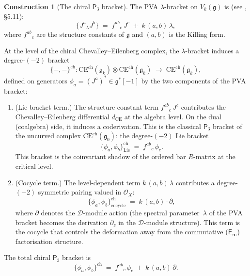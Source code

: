 \documentclass[11pt,reqno]{amsart}
\theoremstyle{definition}
\newtheorem{construction}[theorem]{Construction}
\theoremstyle{remark}
\newcommand{\cD}{\mathcal{D}}
\newcommand{\cO}{\mathcal{O}}
\newcommand{\CE}{\mathrm{CE}}
\newcommand{\Einf}{\mathsf{E}_{\infty}}
\newcommand{\Pthree}{\mathsf{P}_{3}}
\newcommand{\fg}{\mathfrak{g}}
\numberwithin{equation}{section}
\begin{document}
\begin{construction}[The chiral $\Pthree$ bracket]
\label{constr:chiral-p3-bracket}
The PVA $\lambda$-bracket on $V_k(\fg)$ is
(see \cite{Lorgat26I}, \S5.11):
\begin{equation}\label{eq:pva-bracket-recall}
  \{J^a \mathbin{{}_\lambda} J^b\}
  \;=\;
  f^{ab}{}_c\, J^c \;+\; k\,(a,b)\,\lambda,
\end{equation}
where $f^{ab}{}_c$ are the structure constants of $\fg$ and
$(a,b)$ is the Killing form.

At the level of the chiral Chevalley--Eilenberg complex, the
$\lambda$-bracket induces a degree-$(-2)$ bracket
\begin{equation}\label{eq:chiral-p3-def}
  \{-,-\}^{\mathrm{ch}}
  \colon
  \CE^{\mathrm{ch}}(\fg_k)
  \otimes
  \CE^{\mathrm{ch}}(\fg_k)
  \;\longrightarrow\;
  \CE^{\mathrm{ch}}(\fg_k),
\end{equation}
defined on generators $\phi_a = (J^a)^* \in \fg^*[-1]$ by
the two components of the PVA bracket:
\begin{enumerate}[label=\textup{(\roman*)}]
\item \textup{(Lie bracket term.)}
  The structure constant term $f^{ab}{}_c\,J^c$ contributes
  the Chevalley--Eilenberg differential $d_{\CE}$ at the
  algebra level. On the dual (coalgebra) side, it induces a
  coderivation.
  This is the classical $\Pthree$ bracket of the
  uncurved complex $\CE^{\mathrm{ch}}(\fg_0)$: the degree-$(-2)$
  Lie bracket
  \begin{equation}\label{eq:p3-lie-component}
    \{\phi_a, \phi_b\}^{\mathrm{ch}}_{\mathrm{Lie}}
    \;=\;
    f^{ab}{}_c\,\phi_c.
  \end{equation}
  This bracket is the coinvariant shadow of the ordered bar
  $R$-matrix at the critical level.
\item \textup{(Cocycle term.)}
  The level-dependent term $k\,(a,b)\,\lambda$ contributes a
  degree-$(-2)$ symmetric pairing valued in $\cO_X$:
  \begin{equation}\label{eq:p3-cocycle-component}
    \{\phi_a, \phi_b\}^{\mathrm{ch}}_{\mathrm{cocycle}}
    \;=\;
    k\,(a,b) \cdot \partial,
  \end{equation}
  where $\partial$ denotes the $\cD$-module action
  (the spectral parameter~$\lambda$ of the PVA bracket
  becomes the derivation $\partial_z$ in the $\cD$-module
  structure). This term is the cocycle that controls
  the deformation away from the commutative
  ($\Einf$) factorisation structure.
\end{enumerate}

The total chiral $\Pthree$ bracket is
\begin{equation}\label{eq:chiral-p3-total}
  \{\phi_a, \phi_b\}^{\mathrm{ch}}
  \;=\;
  f^{ab}{}_c\,\phi_c
  \;+\;
  k\,(a,b)\,\partial.
\end{equation}
\end{construction}
\end{document}
